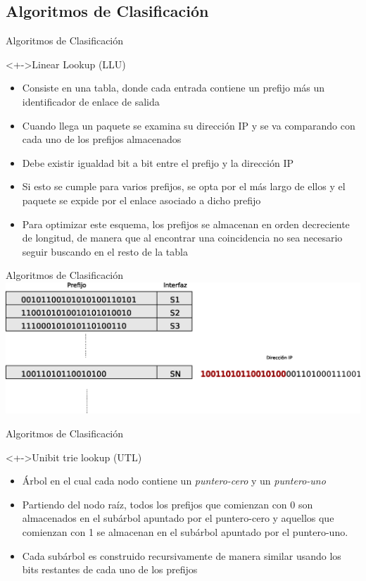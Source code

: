\documentclass[xcolor=dvipsnames]{beamer}
\begin{document}
\subsection{Algoritmos de Clasificación}
\begin{frame}{Algoritmos de Clasificación}
\begin{block}<+->{Linear Lookup (LLU)}   
    \begin{itemize}
      \scriptsize     	
	\item Consiste en una tabla, donde cada entrada contiene un prefijo más un identificador de enlace de salida
	\item Cuando llega un paquete se examina su dirección IP y se va comparando con cada uno de los prefijos almacenados
	\item Debe existir igualdad bit a bit entre el prefijo y la dirección IP
	\item Si esto se cumple para varios prefijos, se opta por el más largo de ellos y el paquete se expide por el enlace asociado a dicho prefijo
	\item Para optimizar este esquema, los prefijos se almacenan en orden decreciente de longitud, de manera que al encontrar una coincidencia no sea necesario seguir buscando en el resto de la tabla
    \end{itemize}
  \end{block}
\end{frame}

\begin{frame}{Algoritmos de Clasificación}
\center 
\includegraphics[scale=0.40]{figures/linear.eps}
\end{frame}


\begin{frame}{Algoritmos de Clasificación}
  \begin{block}<+->{Unibit trie lookup (UTL)}   
    \begin{itemize}
      \scriptsize
     	\item Árbol en el cual cada nodo contiene un \textit{puntero-cero }y un \textit{puntero-uno}
	\item Partiendo del nodo raíz, todos los prefijos que comienzan con 0 son almacenados en el subárbol apuntado por el puntero-cero y aquellos que comienzan con 1 se almacenan en el subárbol apuntado por el puntero-uno.
	\item Cada subárbol es construido recursivamente de manera similar usando los bits restantes de cada uno de los prefijos
    \end{itemize}
  \end{block}
\end{frame}
\end{document}

